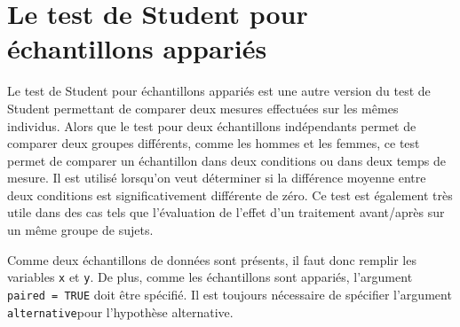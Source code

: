 \documentclass[
]{book}
\newenvironment{Shaded}{\begin{snugshade}}{\end{snugshade}}
\newcommand{\AttributeTok}[1]{\textcolor[rgb]{0.13,0.29,0.53}{#1}}
\newcommand{\CommentTok}[1]{\textcolor[rgb]{0.56,0.35,0.01}{\textit{#1}}}
\newcommand{\ConstantTok}[1]{\textcolor[rgb]{0.56,0.35,0.01}{#1}}
\newcommand{\DecValTok}[1]{\textcolor[rgb]{0.00,0.00,0.81}{#1}}
\newcommand{\FunctionTok}[1]{\textcolor[rgb]{0.13,0.29,0.53}{\textbf{#1}}}
\newcommand{\NormalTok}[1]{#1}
\newcommand{\OtherTok}[1]{\textcolor[rgb]{0.56,0.35,0.01}{#1}}
\newcommand{\SpecialCharTok}[1]{\textcolor[rgb]{0.81,0.36,0.00}{\textbf{#1}}}
\newcommand{\StringTok}[1]{\textcolor[rgb]{0.31,0.60,0.02}{#1}}
\begin{document}
\section{Le test de Student pour échantillons appariés}\label{le-test-de-student-pour-uxe9chantillons-appariuxe9s}

Le test de Student pour échantillons appariés est une autre version du test de Student permettant de comparer deux mesures effectuées sur les mêmes individus. Alors que le test pour deux échantillons indépendants permet de comparer deux groupes différents, comme les hommes et les femmes, ce test permet de comparer un échantillon dans deux conditions ou dans deux temps de mesure. Il est utilisé lorsqu'on veut déterminer si la différence moyenne entre deux conditions est significativement différente de zéro. Ce test est également très utile dans des cas tels que l'évaluation de l'effet d'un traitement avant/après sur un même groupe de sujets.

Comme deux échantillons de données sont présents, il faut donc remplir les variables \texttt{x} et \texttt{y}. De plus, comme les échantillons sont appariés, l'argument \texttt{paired\ =\ TRUE} doit être spécifié. Il est toujours nécessaire de spécifier l'argument \texttt{alternative}pour l'hypothèse alternative.

\begin{Shaded}
\end{Shaded}
\end{document}
